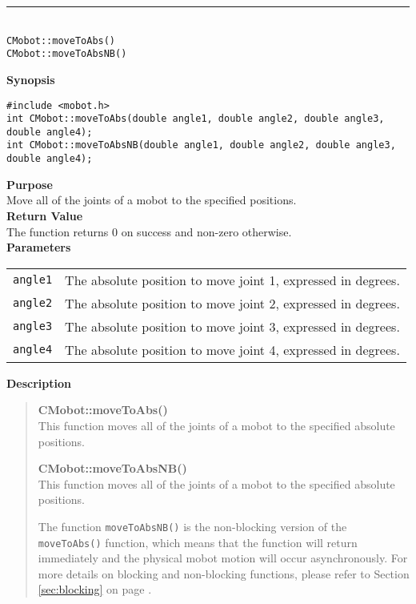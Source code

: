 \noindent
\vspace{5pt}
\rule{4.5in}{0.015in}\\
\noindent
{\LARGE \texttt{CMobot::moveToAbs()}}\\
{\LARGE \texttt{CMobot::moveToAbsNB()}}\\
{}

\noindent
{\bf Synopsis}
\vspace{-8pt}
\begin{verbatim}
#include <mobot.h>
int CMobot::moveToAbs(double angle1, double angle2, double angle3, double angle4);
int CMobot::moveToAbsNB(double angle1, double angle2, double angle3, double angle4);
\end{verbatim}

\noindent
{\bf Purpose}\\
Move all of the joints of a mobot to the specified positions.\\

\noindent
{\bf Return Value}\\
The function returns 0 on success and non-zero otherwise.\\

\noindent
{\bf Parameters}\\
\vspace{-0.1in}
\begin{description}
\item               
\begin{tabular}{p{15 mm}p{105 mm}}
\texttt{angle1} & The absolute position to move joint 1, expressed in degrees. \\
\texttt{angle2} & The absolute position to move joint 2, expressed in degrees. \\
\texttt{angle3} & The absolute position to move joint 3, expressed in degrees. \\
\texttt{angle4} & The absolute position to move joint 4, expressed in degrees. \\
\end{tabular}
\end{description}
\noindent

{\bf Description}\\
\vspace{-12pt}
\begin{quote}
{\bf CMobot::moveToAbs()}\\
This function moves all of the joints of a mobot to the specified absolute positions. 

{\bf CMobot::moveToAbsNB()}\\
This function moves all of the joints of a mobot to the specified absolute positions. 

The function \texttt{moveToAbsNB()} is the non-blocking version of
the \texttt{moveToAbs()} function, which means that the function will return
immediately and the physical mobot motion will occur asynchronously. For
more details on blocking and non-blocking functions, please refer to 
Section \ref{sec:blocking} on page \pageref{sec:blocking}.\\
\end{quote}

